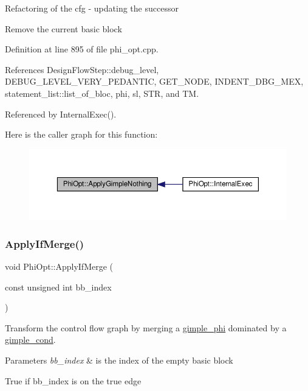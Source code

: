 Refactoring of the cfg -\/ updating the successor

Remove the current basic block 

Definition at line 895 of file phi\+\_\+opt.\+cpp.



References Design\+Flow\+Step\+::debug\+\_\+level, D\+E\+B\+U\+G\+\_\+\+L\+E\+V\+E\+L\+\_\+\+V\+E\+R\+Y\+\_\+\+P\+E\+D\+A\+N\+T\+IC, G\+E\+T\+\_\+\+N\+O\+DE, I\+N\+D\+E\+N\+T\+\_\+\+D\+B\+G\+\_\+\+M\+EX, statement\+\_\+list\+::list\+\_\+of\+\_\+bloc, phi, sl, S\+TR, and TM.



Referenced by Internal\+Exec().

Here is the caller graph for this function\+:
\nopagebreak
\begin{figure}[H]
\begin{center}
\leavevmode
\includegraphics[width=350pt]{dc/ddf/classPhiOpt_a1bfa08060f3cb11d7c12163b4bd83e7d_icgraph}
\end{center}
\end{figure}
\mbox{\label{classPhiOpt_a3ad16335886d4b4ef6f00b7d4d087ff5}} 
\subsubsection{\texorpdfstring{Apply\+If\+Merge()}{ApplyIfMerge()}}
{\footnotesize\ttfamily void Phi\+Opt\+::\+Apply\+If\+Merge (\begin{DoxyParamCaption}\item[{const unsigned int}]{bb\+\_\+index }\end{DoxyParamCaption})\hspace{0.3cm}{\ttfamily [private]}}



Transform the control flow graph by merging a \hyperlink{structgimple__phi}{gimple\+\_\+phi} dominated by a \hyperlink{structgimple__cond}{gimple\+\_\+cond}. 


\begin{DoxyParams}{Parameters}
{\em bb\+\_\+index} & is the index of the empty basic block \\
\hline
\end{DoxyParams}
True if bb\+\_\+index is on the true edge

